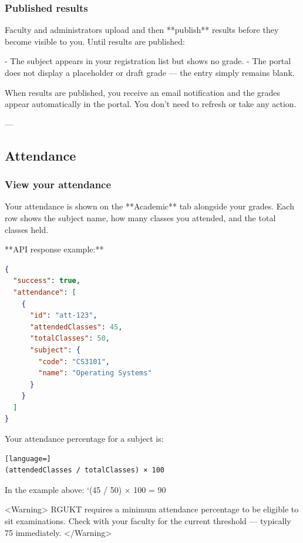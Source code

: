 \subsubsection{Published results}

Faculty and administrators upload and then **publish** results before they become visible to you. Until results are published:

- The subject appears in your registration list but shows no grade.
- The portal does not display a placeholder or draft grade — the entry simply remains blank.

When results are published, you receive an email notification and the grades appear automatically in the portal. You don't need to refresh or take any action.

---

\subsection{Attendance}

\subsubsection{View your attendance}

Your attendance is shown on the **Academic** tab alongside your grades. Each row shows the subject name, how many classes you attended, and the total classes held.

**API response example:**

\begin{lstlisting}[language=json]
{
  "success": true,
  "attendance": [
    {
      "id": "att-123",
      "attendedClasses": 45,
      "totalClasses": 50,
      "subject": {
        "code": "CS3101",
        "name": "Operating Systems"
      }
    }
  ]
}

\end{lstlisting}

Your attendance percentage for a subject is:

\begin{lstlisting}[language=]
(attendedClasses / totalClasses) × 100

\end{lstlisting}

In the example above: `(45 / 50) × 100 = 90%

<Warning>
  RGUKT requires a minimum attendance percentage to be eligible to sit
  examinations. Check with your faculty for the current threshold — typically
  75%
  immediately.
</Warning>

